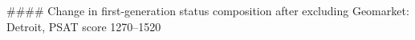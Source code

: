 #### Change in first-generation status composition after excluding Geomarket: Detroit, PSAT score 1270–1520
